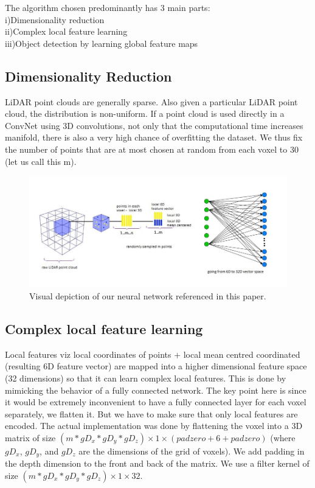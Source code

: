 \documentclass{article}
\begin{document}
The algorithm chosen predominantly has 3 main parts:\\
\hangindent=0.5cm i)\hspace{.4cm}Dimensionality reduction\\
ii)\hspace{.3cm}Complex local feature learning\\
iii)\hspace{.2cm}Object detection by learning global feature maps

\subsection{Dimensionality Reduction}

LiDAR point clouds are generally sparse. Also given a particular LiDAR point cloud, the distribution is non-uniform. If a point cloud is used directly in a ConvNet using 3D convolutions, not only that the computational time increases manifold, there is also a very high chance of overfitting the dataset. We thus fix the number of points that are at most chosen at random from each voxel to 30 (let us call this m). 

\begin{figure}
	\centering
	\includegraphics[width=1.0\textwidth]{Final_figure.jpg}
	\caption{Visual depiction of our neural network referenced in this paper.}
\end{figure}

\subsection{Complex local feature learning}

Local features viz local coordinates of points + local mean centred coordinated (resulting 6D feature vector) are mapped into a higher dimensional feature space (32 dimensions) so that it can learn complex local features. This is done by mimicking the behavior of a fully connected network. The key point here is since it would be extremely inconvenient to have a fully connected layer for each voxel separately, we flatten it. But we have to make sure that only local features are encoded. The actual implementation was done by flattening the voxel into a 3D matrix of size \((m*gD_x*gD_y*gD_z) \times 1 \times (padzero + 6 + padzero) \) (where \(gD_x\), \(gD_y\), and \(gD_z\) are the dimensions of the grid of voxels). We add padding in the depth dimension to the front and back of the matrix. We use a filter kernel of size \((m*gD_x*gD_y*gD_z) \times 1 \times 32 \).
\end{document}
